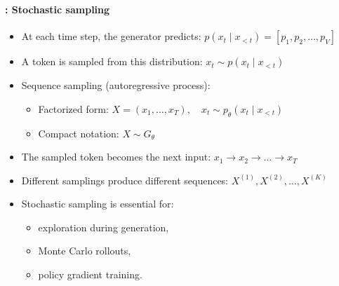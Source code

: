 \documentclass[xcolor=table]{beamer}
\begin{document}
	\begin{frame}
		\frametitle{\insertshortsubtitle}
		\framesubtitle{\insertsection: Stochastic sampling}
		
		\begin{itemize}
			
			\item At each time step, the generator predicts:
			$p(x_t \mid x_{<t}) = [p_1, p_2, \dots, p_V]$
			
			\item A token is sampled from this distribution:
			$x_t \sim p(x_t \mid x_{<t})$
			
			\item Sequence sampling (autoregressive process):
			\begin{itemize}
				\item Factorized form:
				$X=(x_1,\dots,x_T), \quad x_t \sim p_\theta(x_t \mid x_{<t})$
				
				\item Compact notation:
				$X \sim G_\theta$
			\end{itemize}
			
			\item The sampled token becomes the next input:
			$x_1 \rightarrow x_2 \rightarrow \dots \rightarrow x_T$
			
			
			\item Different samplings produce different sequences:
			$X^{(1)}, X^{(2)}, \dots, X^{(K)}$
			
			
			\item Stochastic sampling is essential for:
			\begin{itemize}
				\item exploration during generation,
				\item Monte Carlo rollouts,
				\item policy gradient training.
			\end{itemize}
			
		\end{itemize}
		
	\end{frame}
	
\end{document}
